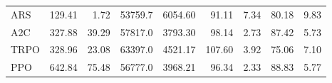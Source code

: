 \begin{samepage}
\begin{center}
\begin{tabular}{l|rr|rr|rr|rr}
    ARS          &   129.41 &     1.72 &    53759.7 &    6054.60 &   91.11 &    7.34 &   80.18 &    9.83 \\
    A2C          &   327.88 &    39.29 &    57817.0 &    3793.30 &   98.14 &    2.73 &   87.42 &    5.73 \\
    TRPO         &   328.96 &    23.08 &    63397.0 &    4521.17 &  107.60 &    3.92 &   75.06 &    7.10 \\
    PPO          &   642.84 &    75.48 &    56777.0 &    3968.21 &   96.34 &    2.33 &   88.83 &    5.77 \\
    \bottomrule
  \end{tabular}
\end{center}
\end{samepage}

